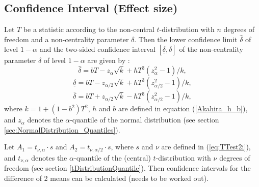 \subsection{Confidence Interval (Effect size)}
Let $T$ be a statistic according to the non-central $t$-distribution
with $n$ degrees of freedom and a non-centrality parameter $\delta$. Then
the lower confidence limit $\widehat{\delta}$ of level $1-\alpha$ and the two-sided confidence interval $[ \underline{\delta},\overline{\delta}]$ of the
non-centrality parameter $\delta$ of level $1-\alpha$ are given by \cite{akahira_1995}:
\begin{equation}
	\widehat{\delta} = bT - z_\alpha \sqrt{k} +  h T^3 (z_\alpha^2 - 1)/k,
\end{equation} 
\begin{equation}
	\underline{\delta} = bT - z_{\alpha/2} \sqrt{k} +  h T^3 (z_{\alpha/2}^2 - 1)/k,
\end{equation} 
\begin{equation}
	\overline{\delta} = bT + z_{\alpha/2} \sqrt{k} -  h T^3 (z_{\alpha/2}^2 - 1)/k,
\end{equation} 
where $k=1+(1-b^2)T^2$, $h$ and $b$ are defined in equation (\ref{Akahira_h_b}), and $z_\alpha$ denotes the $\alpha$-quantile of the normal distribution (see section \ref{sec:NormalDistribution_Quantiles}).


Let $A_1=t_{\nu,\alpha} \cdot s$ and $A_2=t_{\nu,\alpha/2} \cdot s$, where $s$ and $\nu$ are defined in (\ref{eq:TTest2i}), and $t_{\nu,\alpha}$ denotes the $\alpha$-quantile of the (central) $t$-distribution with $\nu$ degrees of freedom (see section \ref{tDistributionQuantile}). Then confidence intervals for the difference of 2 means can be calculated (needs to be worked out).


